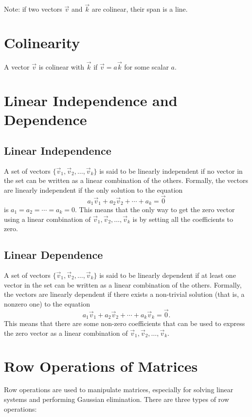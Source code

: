 \documentclass[10pt]{article}
\theoremstyle{plain}
\theoremstyle{definition}
\theoremstyle{remark}
\begin{document}
Note: if two vectors \(\vec{v}\) and \(\vec{k}\) are colinear, their span is a line.

\section{Colinearity}

A vector \(\vec{v}\) is colinear with \(\vec{k}\) if \(\vec{v}=a\vec{k}\) for some scalar \(a\).

\section{Linear Independence and Dependence}

\subsection{Linear Independence}
A set of vectors \(\{\vec{v}_1, \vec{v}_2, \ldots, \vec{v}_k\}\) is said to be linearly independent if no vector in the set can be written as a linear combination of the others. Formally, the vectors are linearly independent if the only solution to the equation
\[
a_1 \vec{v}_1 + a_2 \vec{v}_2 + \cdots + a_k = \vec{0}
\]
is \(a_1 = a_2 = \cdots = a_k = 0\). This means that the only way to get the zero vector using a linear combination of \(\vec{v}_1, \vec{v}_2, \ldots, \vec{v}_k\) is by setting all the coefficients to zero.

\subsection{Linear Dependence}
A set of vectors \(\{\vec{v}_1, \vec{v}_2, \ldots, \vec{v}_k\}\) is said to be linearly dependent if at least one vector in the set can be written as a linear combination of the others. Formally, the vectors are linearly dependent if there exists a non-trivial solution (that is, a nonzero one) to the equation
\[
a_1 \vec{v}_1 + a_2 \vec{v}_2 + \cdots + a_k \vec{v}_k = \vec{0}.
\]
This means that there are some non-zero coefficients that can be used to express the zero vector as a linear combination of \(\vec{v}_1, \vec{v}_2, \ldots, \vec{v}_k\).

\section{Row Operations of Matrices}

Row operations are used to manipulate matrices, especially for solving linear systems and performing Gaussian elimination. There are three types of row operations:
\end{document}
